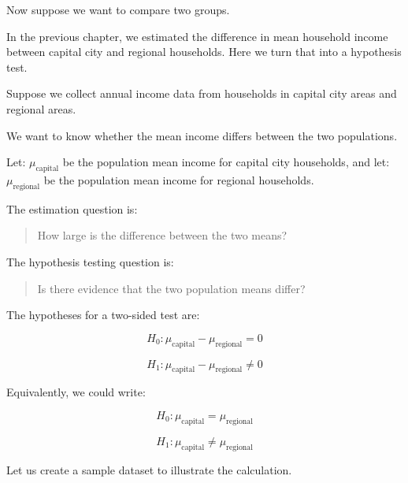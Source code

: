 \documentclass[
  letterpaper,
  DIV=11,
  numbers=noendperiod]{scrreprt}
\begin{document}
Now suppose we want to compare two groups.

In the previous chapter, we estimated the difference in mean household
income between capital city and regional households. Here we turn that
into a hypothesis test.

\begin{tcolorbox}[enhanced jigsaw, arc=.35mm, bottomrule=.15mm, bottomtitle=1mm, breakable, colback=white, colbacktitle=quarto-callout-note-color!10!white, colframe=quarto-callout-note-color-frame, coltitle=black, left=2mm, leftrule=.75mm, opacityback=0, opacitybacktitle=0.6, rightrule=.15mm, title=\textcolor{quarto-callout-note-color}{\faInfo}\hspace{0.5em}{Household income in two regions}, titlerule=0mm, toprule=.15mm, toptitle=1mm]

Suppose we collect annual income data from households in capital city
areas and regional areas.

We want to know whether the mean income differs between the two
populations.

\end{tcolorbox}

Let: \(\mu_{\text{capital}}\) be the population mean income for capital
city households, and let: \(\mu_{\text{regional}}\) be the population
mean income for regional households.

The estimation question is:

\begin{quote}
How large is the difference between the two means?
\end{quote}

The hypothesis testing question is:

\begin{quote}
Is there evidence that the two population means differ?
\end{quote}

The hypotheses for a two-sided test are:

\[
H_0: \mu_{\text{capital}} - \mu_{\text{regional}} = 0
\]

\[
H_1: \mu_{\text{capital}} - \mu_{\text{regional}} \neq 0
\]

Equivalently, we could write:

\[
H_0: \mu_{\text{capital}} = \mu_{\text{regional}}
\]

\[
H_1: \mu_{\text{capital}} \neq \mu_{\text{regional}}
\]

Let us create a sample dataset to illustrate the calculation.
\end{document}
